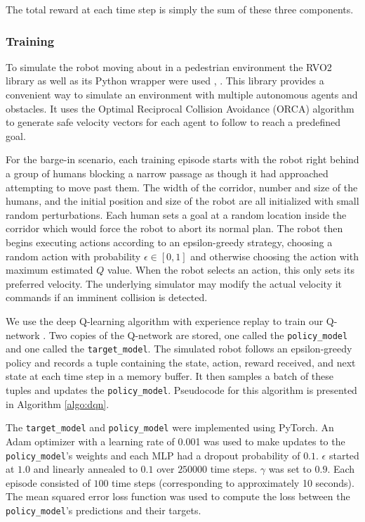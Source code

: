 \documentclass[letterpaper]{article}
\begin{document}
				The total reward at each time step is simply the sum of these three components.
				\subsubsection{Training} 
				To simulate the robot moving about in a pedestrian environment the RVO2 library as well as its Python wrapper were used \cite{rvo2}, \cite{pyrvo2}. This library provides a convenient way to simulate an environment with multiple autonomous agents and obstacles. It uses the Optimal Reciprocal Collision Avoidance (ORCA) \cite{orca} algorithm to generate safe velocity vectors for each agent to follow to reach a predefined goal.
				
				For the barge-in scenario, each training episode starts with the robot right behind a group of humans blocking a narrow passage as though it had approached attempting to move past them. The width of the corridor, number and size of the humans, and the initial position and size of the robot are all initialized with small random perturbations. Each human sets a goal at a random location inside the corridor which would force the robot to abort its normal plan. The robot then begins executing actions according to an epsilon-greedy strategy, choosing a random action with probability $\epsilon \in [0, 1]$ and otherwise choosing the action with maximum estimated $Q$ value. When the robot selects an action, this only sets its preferred velocity. The underlying simulator may modify the actual velocity it commands if an imminent collision is detected. 
				
				We use the deep Q-learning algorithm with experience replay to train our Q-network \cite{dqn}. Two copies of the Q-network are stored, one called the \verb|policy_model| and one called the \verb|target_model|. The simulated robot follows an epsilon-greedy policy and records a tuple containing the state, action, reward received, and next state at each time step in a memory buffer. It then samples a batch of these tuples and updates the \verb|policy_model|. Pseudocode for this algorithm is presented in Algorithm \ref{algo:dqn}.
				
				The \verb|target_model| and \verb|policy_model| were implemented using PyTorch. An Adam optimizer with a learning rate of 0.001 was used to make updates to the \verb|policy_model|'s weights and each MLP had a dropout probability of $0.1$. $\epsilon$ started at $1.0$ and linearly annealed to $0.1$ over $250000$ time steps. $\gamma$ was set to $0.9$. Each episode consisted of $100$ time steps (corresponding to approximately 10 seconds). The mean squared error loss function was used to compute the loss between the \verb|policy_model|'s predictions and their targets.
			
\end{document}
